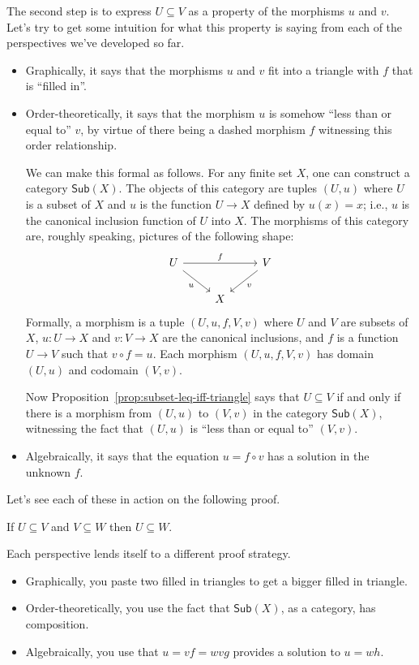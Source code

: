 The second step is to express \(U\subseteq V\)
as a property of the morphisms \(u\) and \(v\).
Let's try to get some intuition for what this property is saying
from each of the perspectives we've developed so far.
\begin{itemize}
\item Graphically, it says that the morphisms \(u\) and \(v\)
  fit into a triangle with \(f\) that is ``filled in''.
\item Order-theoretically, it says that the morphism \(u\) is somehow
  ``less than or equal to'' \(v\), by virtue of there being a dashed morphism
  \(f\) witnessing this order relationship.

  We can make this formal as follows.
  For any finite set \(X\), one can construct a category \(\mathsf{Sub}(X)\).
  The objects of this category are tuples \((U,u)\) where \(U\) is a subset of \(X\)
  and \(u\) is the function \(U \to X\) defined by \(u(x) = x\);
  i.e., \(u\) is the canonical inclusion function of \(U\) into \(X\).
  The morphisms of this category are, roughly speaking,
  pictures of the following shape:
  \[
\begin{tikzcd}
U \arrow[rd, "u"'] \arrow[rr, "f"] &   & V \arrow[ld, "v"] \\
                                   & X &
\end{tikzcd}
  \]
  Formally, a morphism is a tuple \((U,u,f,V,v)\)
  where \(U\) and \(V\) are subsets of \(X\),
  \(u : U \to X\) and \(v : V \to X\) are the canonical inclusions,
  and \(f\) is a function \(U \to V\)
  such that \(v \circ f = u\).
  Each morphism \((U,u,f,V,v)\) has domain \((U,u)\)
  and codomain \((V,v)\).

  Now Proposition~\ref{prop:subset-leq-iff-triangle}
  says that \(U\subseteq V\) if and only if there is a morphism from \((U,u)\)
  to \((V,v)\) in the category \(\mathsf{Sub}(X)\),
  witnessing the fact that \((U,u)\) is ``less than or equal to'' \((V,v)\).

\item Algebraically, it says that the equation \(u = f \circ v\)
  has a solution in the unknown \(f\).
\end{itemize}
Let's see each of these in action on the following proof.
\begin{proposition}
  If \(U\subseteq V\) and \(V \subseteq W\) then \(U\subseteq W\).
\end{proposition}
Each perspective lends itself to a different proof strategy.
\begin{itemize}
\item Graphically, you paste two filled in triangles to get a bigger filled in triangle.
\item Order-theoretically, you use the fact that \(\mathsf{Sub}(X)\), as a category,
  has composition.
\item Algebraically, you use that \(u = vf = wvg\) provides a solution to \(u = wh\).
\end{itemize}

